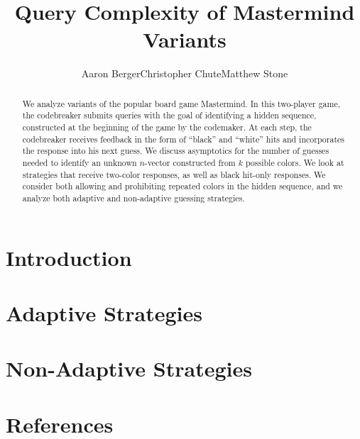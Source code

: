 \documentclass[12pt, a4paper]{article}
\author{Aaron Berger\qquad Christopher Chute\qquad Matthew Stone}
\title{Query Complexity of Mastermind Variants}
\begin{document}
\maketitle

\begin{abstract}
We analyze variants of the popular board game Mastermind. In this two-player game,
the codebreaker submits queries with the goal of identifying a hidden
sequence, constructed at the beginning of the game by the codemaker. At each step,
the codebreaker receives feedback in the form of ``black'' and ``white'' hits
and incorporates the response into his next guess. We discuss asymptotics for the
number of guesses needed to identify an unknown $n$-vector constructed from $k$
possible colors. We look at strategies that receive two-color responses, as well as
black hit-only responses. We consider both allowing and prohibiting repeated
colors in the hidden sequence, and we analyze both adaptive and non-adaptive guessing
strategies.
\end{abstract}

\section{Introduction}


\section{Adaptive Strategies}


\section{Non-Adaptive Strategies}


\clearpage
\section*{References}
\end{document}

